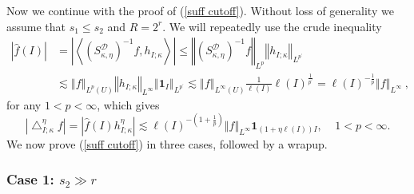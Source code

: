 \documentclass{amsart}%
\theoremstyle{plain}
\numberwithin{equation}{section}
\begin{document}
Now we continue with the proof of (\ref{suff cutoff}). Without loss of
generality we assume that $s_{1}\leq s_{2}$ and $R=2^{r}$. We will repeatedly
use the crude inequality%
\begin{align*}
\left\vert \widehat{f}\left(  I\right)  \right\vert  & =\left\vert
\left\langle \left(  S_{\kappa,\eta}^{\mathcal{D}}\right)  ^{-1}f,h_{I;\kappa
}\right\rangle \right\vert \leq\left\Vert \left(  S_{\kappa,\eta}%
^{\mathcal{D}}\right)  ^{-1}f\right\Vert _{L^{p}}\left\Vert h_{I;\kappa
}\right\Vert _{L^{p^{\prime}}}\\
& \lesssim\left\Vert f\right\Vert _{L^{p}\left(  U\right)  }\left\Vert
h_{I;\kappa}\right\Vert _{L^{\infty}}\left\Vert \mathbf{1}_{I}\right\Vert
_{L^{p^{\prime}}}\lesssim\left\Vert f\right\Vert _{L^{\infty}\left(  U\right)
}\frac{1}{\ell\left(  I\right)  }\ell\left(  I\right)  ^{\frac{1}{p^{\prime}}%
}=\ell\left(  I\right)  ^{-\frac{1}{p}}\left\Vert f\right\Vert _{L^{\infty}%
}\ ,
\end{align*}
for any $1<p<\infty$, which gives%
\[
\left\vert \bigtriangleup_{I;\kappa}^{\eta}f\right\vert =\left\vert
\widehat{f}\left(  I\right)  h_{I;\kappa}^{\eta}\right\vert \lesssim
\ell\left(  I\right)  ^{-\left(  1+\frac{1}{p}\right)  }\left\Vert
f\right\Vert _{L^{\infty}}\mathbf{1}_{\left(  1+\eta\ell\left(  I\right)
\right)  I},\ \ \ \ \ 1<p<\infty.
\]
We now prove (\ref{suff cutoff}) in three cases, followed by a wrapup.

\subsubsection{Case 1: $s_{2}\gg r$}
\end{document}
